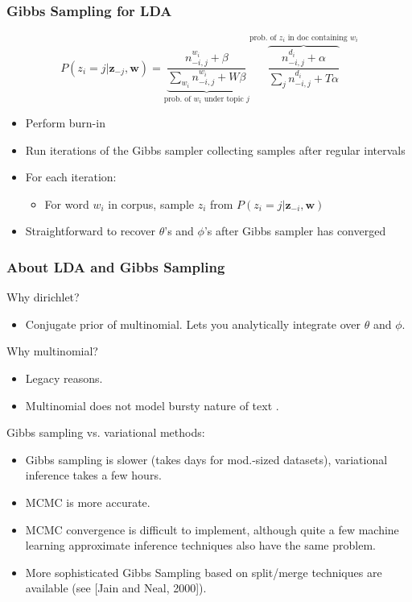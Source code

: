 \documentclass[10pt, svgnames]{beamer}
\begin{document}
\begin{frame}
\frametitle{Gibbs Sampling for LDA \cite{griffiths:pnas04}}
\begin{equation*}
P(z_i = j | \mathbf{z}_{-j}, \mathbf{w}) = \underbrace{\frac{n^{w_i}_{-i,j} + \beta}{\sum_{w_i} n^{w_i}_{-i,j} + W\beta}}_{\textrm{prob. of $w_i$ under topic $j$}}\overbrace{\frac{n^{d_i}_{-i,j} + \alpha}{\sum_j n_{-i,j}^{d_i} + T \alpha}}^{\textrm{prob. of $z_i$ in doc containing $w_i$}}
\end{equation*}
\footnotesize{
\begin{itemize}
\item Perform burn-in
\item Run iterations of the Gibbs sampler collecting samples after regular intervals
\item For each iteration:
\begin{itemize}
\item \footnotesize{For word $w_i$ in corpus, sample $z_i$ from $P(z_i = j | \mathbf{z}_{-i}, \mathbf{w})$}
\end{itemize}
\item Straightforward to recover $\theta$'s and $\phi$'s after Gibbs sampler has converged
\end{itemize}
}
\end{frame}

\begin{frame}
\frametitle{About LDA and Gibbs Sampling}
Why dirichlet?
\begin{itemize}
\item \footnotesize{Conjugate prior of multinomial. Lets you analytically integrate over $\theta$ and $\phi$.}
\end{itemize}

\vspace{10pt}

Why multinomial?
\begin{itemize}
\item \footnotesize{Legacy reasons.} 
\item \footnotesize{Multinomial does not model bursty nature of text \cite{madsen:icml05}.}
\end{itemize}

\vspace{10pt}

Gibbs sampling vs. variational methods:
\footnotesize{
\begin{itemize}
\item Gibbs sampling is slower (takes days for mod.-sized datasets), variational inference takes a few hours.
\item MCMC is more accurate.
\item MCMC convergence is difficult to implement, although quite a few machine learning approximate inference techniques also have the same problem.
\item More sophisticated Gibbs Sampling based on split/merge techniques are available (see [Jain and Neal, 2000]). 
\end{itemize}
}
\end{frame}
\end{document}
